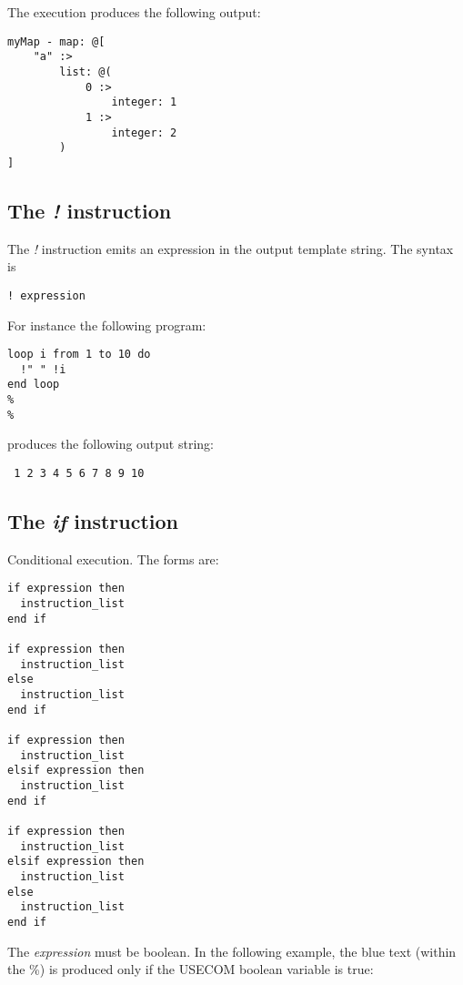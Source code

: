 \documentclass[11pt]{article}
\newcommand{\var}[1]{{\small\ttfamily #1}}
\begin{document}
{The execution produces the following output:

{\small
\begin{verbatim}
myMap - map: @[
    "a" :>
        list: @(
            0 :>
                integer: 1
            1 :>
                integer: 2
        )
]

\end{verbatim}
}

\subsection{The {\em !} instruction}

The {\em !} instruction emits an expression in the output template string. The syntax is

\begin{lstlisting}
! expression
\end{lstlisting}

For instance the following program:

\begin{lstlisting}
loop i from 1 to 10 do
  !" " !i
end loop
%
%
\end{lstlisting}

produces the following output string:

\begin{verbatim}
 1 2 3 4 5 6 7 8 9 10

\end{verbatim}

\subsection{The {\em if} instruction}

Conditional execution. The forms are:

\begin{lstlisting}
if expression then
  instruction_list
end if

if expression then
  instruction_list
else
  instruction_list
end if

if expression then
  instruction_list
elsif expression then
  instruction_list
end if

if expression then
  instruction_list
elsif expression then
  instruction_list
else
  instruction_list
end if
\end{lstlisting}    

The {\em expression} must be boolean. In the following example, the blue text (within the \%) is produced only if the \var{USECOM} boolean variable is true:

}
\end{document}
